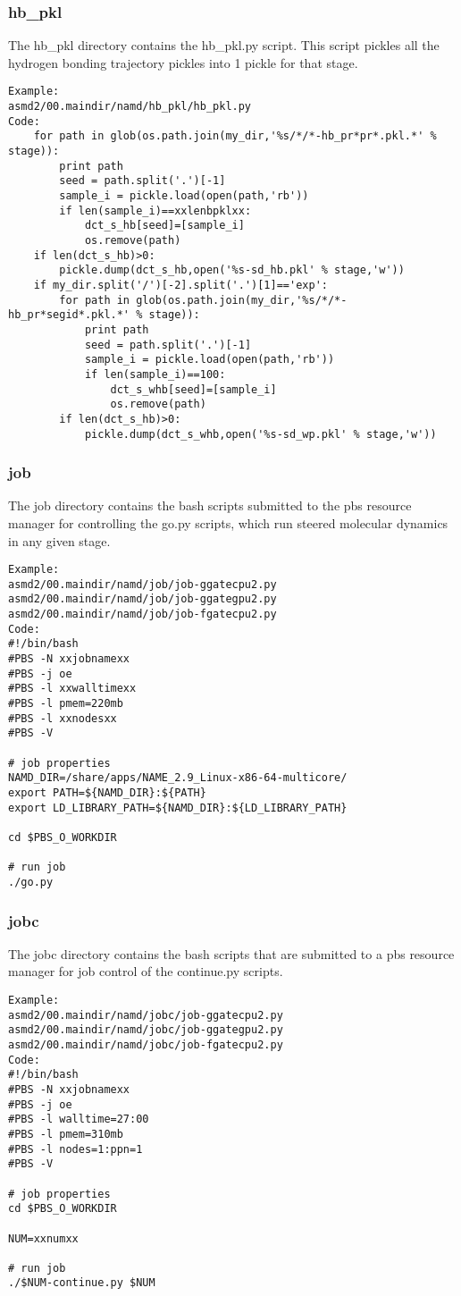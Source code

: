 \documentclass[11pt]{article}
\begin{document}
\subsubsection{hb\_pkl}
The hb\_pkl directory contains the hb\_pkl.py script. This script pickles all the hydrogen bonding trajectory pickles into 1 pickle for that stage.
\begin{verbatim}
Example:
asmd2/00.maindir/namd/hb_pkl/hb_pkl.py
Code:
    for path in glob(os.path.join(my_dir,'%s/*/*-hb_pr*pr*.pkl.*' % stage)):
        print path
        seed = path.split('.')[-1]
        sample_i = pickle.load(open(path,'rb'))
        if len(sample_i)==xxlenbpklxx:
            dct_s_hb[seed]=[sample_i]
            os.remove(path)
    if len(dct_s_hb)>0:
        pickle.dump(dct_s_hb,open('%s-sd_hb.pkl' % stage,'w'))
    if my_dir.split('/')[-2].split('.')[1]=='exp':
        for path in glob(os.path.join(my_dir,'%s/*/*-hb_pr*segid*.pkl.*' % stage)):
            print path
            seed = path.split('.')[-1]
            sample_i = pickle.load(open(path,'rb'))
            if len(sample_i)==100:
                dct_s_whb[seed]=[sample_i]
                os.remove(path)
        if len(dct_s_hb)>0:
            pickle.dump(dct_s_whb,open('%s-sd_wp.pkl' % stage,'w'))
\end{verbatim}

\subsubsection{job}
The job directory contains the bash scripts submitted to the pbs resource manager for controlling the go.py scripts, which run steered molecular dynamics in any given stage.
\begin{verbatim}
Example:
asmd2/00.maindir/namd/job/job-ggatecpu2.py
asmd2/00.maindir/namd/job/job-ggategpu2.py
asmd2/00.maindir/namd/job/job-fgatecpu2.py
Code:
#!/bin/bash
#PBS -N xxjobnamexx
#PBS -j oe
#PBS -l xxwalltimexx
#PBS -l pmem=220mb
#PBS -l xxnodesxx
#PBS -V

# job properties
NAMD_DIR=/share/apps/NAME_2.9_Linux-x86-64-multicore/
export PATH=${NAMD_DIR}:${PATH}
export LD_LIBRARY_PATH=${NAMD_DIR}:${LD_LIBRARY_PATH}

cd $PBS_O_WORKDIR

# run job
./go.py
\end{verbatim}

\subsubsection{jobc}
The jobc directory contains the bash scripts that are submitted to a pbs resource manager for job control of the continue.py scripts.
\begin{verbatim}
Example:
asmd2/00.maindir/namd/jobc/job-ggatecpu2.py
asmd2/00.maindir/namd/jobc/job-ggategpu2.py
asmd2/00.maindir/namd/jobc/job-fgatecpu2.py
Code:
#!/bin/bash
#PBS -N xxjobnamexx
#PBS -j oe
#PBS -l walltime=27:00
#PBS -l pmem=310mb
#PBS -l nodes=1:ppn=1
#PBS -V

# job properties
cd $PBS_O_WORKDIR

NUM=xxnumxx

# run job
./$NUM-continue.py $NUM
\end{verbatim}
\end{document}
